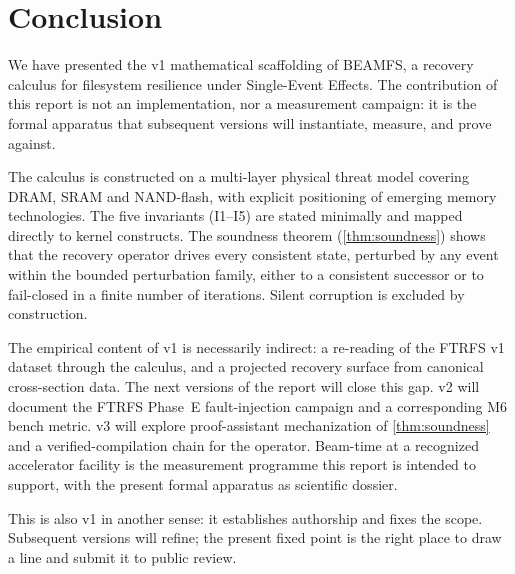 \section{Conclusion}\label{sec:conclusion}

We have presented the v1 mathematical scaffolding of BEAMFS, a
recovery calculus for filesystem resilience under Single-Event
Effects. The contribution of this report is not an implementation,
nor a measurement campaign: it is the formal apparatus that
subsequent versions will instantiate, measure, and prove against.

The calculus is constructed on a multi-layer physical threat model
covering DRAM, SRAM and NAND-flash, with explicit positioning of
emerging memory technologies. The five invariants (I1--I5) are
stated minimally and mapped directly to kernel constructs. The
soundness theorem (\cref{thm:soundness}) shows that the recovery
operator drives every consistent state, perturbed by any event
within the bounded perturbation family, either to a consistent
successor or to fail-closed in a finite number of iterations.
Silent corruption is excluded by construction.

The empirical content of v1 is necessarily indirect: a re-reading
of the FTRFS v1 dataset through the calculus, and a projected
recovery surface from canonical cross-section data. The next
versions of the report will close this gap. v2 will document the
FTRFS Phase~E fault-injection campaign and a corresponding M6
bench metric. v3 will explore proof-assistant mechanization of
\cref{thm:soundness} and a verified-compilation chain for the
operator. Beam-time at a recognized accelerator facility is the
measurement programme this report is intended to support, with
the present formal apparatus as scientific dossier.

This is also v1 in another sense: it establishes authorship and
fixes the scope. Subsequent versions will refine; the present
fixed point is the right place to draw a line and submit it to
public review.
